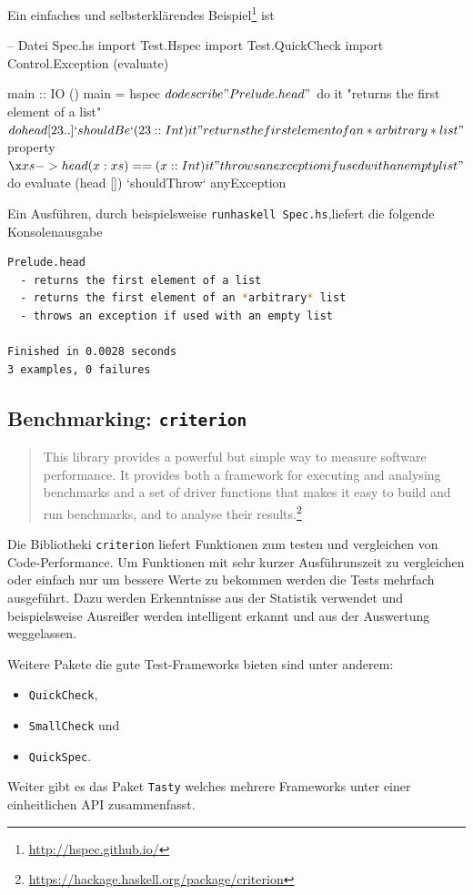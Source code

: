 Ein einfaches und selbsterklärendes
Beispiel\footnote{\url{http://hspec.github.io/}} ist
\begin{hcode}
-- Datei Spec.hs
import Test.Hspec
import Test.QuickCheck
import Control.Exception (evaluate)

main :: IO ()
main = hspec $ do
  describe "Prelude.head" $ do
    it "returns the first element of a list" $ do
      head [23 ..] `shouldBe` (23 :: Int)

    it "returns the first element of an *arbitrary* list" $
      property $ \x xs -> head (x:xs) == (x :: Int)

    it "throws an exception if used with an empty list" $ do
      evaluate (head []) `shouldThrow` anyException
\end{hcode}
Ein Ausführen, durch beispielsweise \texttt{runhaskell Spec.hs},liefert die folgende
Konsolenausgabe
\begin{lstlisting}[language=bash 
                  ,numbers=none
                  ,backgroundcolor=\color{lightgray}]
Prelude.head
  - returns the first element of a list
  - returns the first element of an *arbitrary* list
  - throws an exception if used with an empty list

Finished in 0.0028 seconds
3 examples, 0 failures
\end{lstlisting}

\subsection{Benchmarking: \texttt{criterion}}
\begin{quote}
  This library provides a powerful but simple way to measure software
  performance. It provides both a framework for executing and analysing
  benchmarks and a set of driver functions that makes it easy to build and run
  benchmarks, and to analyse their
  results.\footnote{\url{https://hackage.haskell.org/package/criterion}}
\end{quote}
Die Bibliotheki \texttt{criterion} liefert Funktionen zum testen und vergleichen
von Code-Performance.
Um Funktionen mit sehr kurzer Ausführunszeit zu vergleichen oder einfach nur um
bessere Werte zu bekommen werden die Tests mehrfach ausgeführt.
Dazu werden Erkenntnisse aus der Statistik verwendet und beispielsweise
Ausreißer werden intelligent erkannt und aus der Auswertung weggelassen.

Weitere Pakete die gute Test-Frameworks bieten sind unter anderem:
\begin{itemize}
  \item \texttt{QuickCheck},
  \item \texttt{SmallCheck} und
  \item \texttt{QuickSpec}.
\end{itemize}
Weiter gibt es das Paket \texttt{Tasty} welches mehrere Frameworks unter einer
einheitlichen API zusammenfasst.

